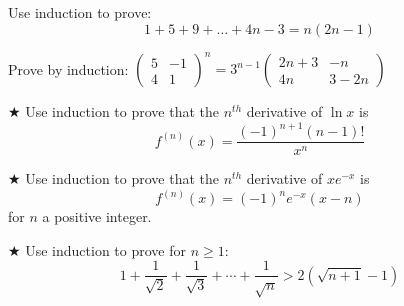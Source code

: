 \begin{proofp}
Use induction to prove: $$1+5+9 + \ldots +4n-3=n(2n-1)$$
\end{proofp}

\begin{proofp}
Prove by induction: $\left(\begin{array}{cc}5 & -1 \\4 & 1\end{array}\right)^n=3^{n-1}\left(\begin{array}{cc}2n+3 & -n \\4n & 3-2n\end{array}\right)$
\end{proofp}

\begin{proofp}$\bigstar$
Use induction to prove that the $n^{th}$ derivative of $\ln x$ is $$f^{(n)}(x)=\frac{(-1)^{n+1}(n-1)!}{x^n}$$
\end{proofp}

\begin{proofp}$\bigstar$
Use induction to prove that the $n^{th}$ derivative of $x e^{-x}$ is $$f^{(n)}(x)=(-1)^{n}e^{-x}(x-n)$$ for $n$ a positive integer.
\end{proofp}

\begin{proofp}$\bigstar$
Use induction to prove for $n \ge 1$: 
$$1+\frac{1}{\sqrt{2}}+\frac{1}{\sqrt{3}}+ \cdots +\frac{1}{\sqrt{n}}> 2(\sqrt{n+1}-1)$$
\end{proofp}
					




